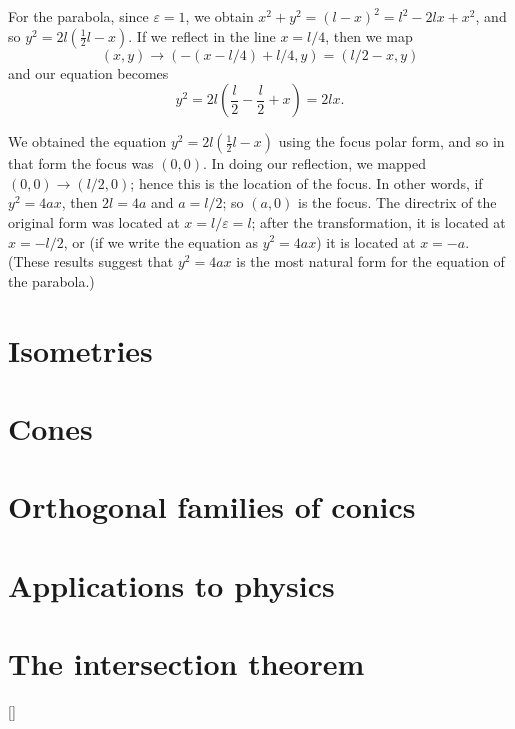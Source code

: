 \documentclass[a4paper,leqno,10pt]{article}
\theoremstyle{exercise}
\theoremstyle{plain}
\theoremstyle{definition}
\theoremstyle{remark}
\begin{document}
For the parabola, since $ \varepsilon = 1 $, we obtain $ x^2 + y^2 = (l - x)^2 = l^2 - 2lx + x^2 $, and so $ y^2 = 2l(\frac{1}{2}l - x) $.
If we reflect in the line $ x = l/4 $, then we map
\begin{displaymath}
  (x,y) \to (-(x - l/4) + l/4, y) = (l/2 - x, y)
\end{displaymath}
and our equation becomes
\begin{displaymath}
  y^2 = 2l\left(\frac{l}{2} - \frac{l}{2} + x \right) = 2lx.
\end{displaymath}

We obtained the equation $ y^2 = 2l(\frac{1}{2}l - x) $ using the focus polar form, and so in that form the focus was $ (0,0) $. In doing
our reflection, we mapped $ (0,0) \to (l/2,0) $; hence this is the location of the focus. In other words, if $ y^2 = 4ax $, then $ 2l = 4a $
and $ a = l/2 $; so $ (a,0) $ is the focus. The directrix of the original form was located at $ x = l/\varepsilon = l $; after the transformation,
it is located at $ x = -l/2 $, or (if we write the equation as $ y^2 = 4ax $) it is located at $ x = -a $. (These results suggest that $ y^2 = 4ax $
is the most natural form for the equation of the parabola.)


\section{Isometries}

\section{Cones}

\section{Orthogonal families of conics}

\section{Applications to physics}

\section{The intersection theorem}

\appendix
{}[{\titlerule[0.8pt]}]
\end{document}
